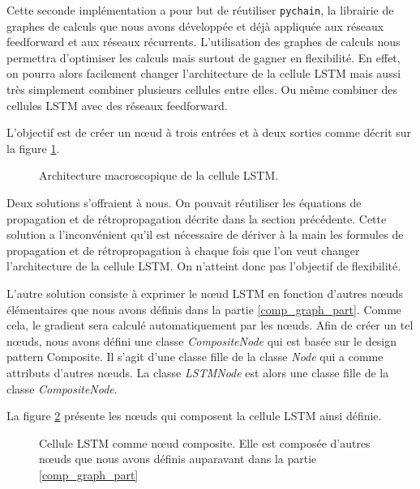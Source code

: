 Cette seconde implémentation a pour but de réutiliser \texttt{pychain}, la librairie de graphes de calculs que nous avons développée et déjà appliquée aux réseaux feedforward et aux réseaux récurrents. L'utilisation des graphes de calculs nous permettra d'optimiser les calculs mais surtout de gagner en flexibilité. En effet, on pourra alors facilement changer l'architecture de la cellule LSTM mais aussi très simplement combiner plusieurs cellules entre elles. Ou même combiner des cellules LSTM avec des réseaux feedforward.

L'objectif est de créer un n\oe{}ud à trois entrées et à deux sorties comme décrit sur la figure \ref{lstm_node_macro}.

\begin{figure}[h!]
\begin{center}

\caption{Architecture macroscopique de la cellule LSTM.}
\label{lstm_node_macro}
\end{center}
\end{figure}

Deux solutions s'offraient à nous. On pouvait réutiliser les équations de propagation et de rétropropagation décrite dans la section précédente. Cette solution a l'inconvénient qu'il est nécessaire de dériver à la main les formules de propagation et de rétropropagation à chaque fois que l'on veut changer l'architecture de la cellule LSTM. On n'atteint donc pas l'objectif de flexibilité.

L'autre solution consiste à exprimer le n\oe{}ud LSTM en fonction d'autres n\oe{}uds élémentaires que nous avons définis dans la partie \ref{comp_graph_part}. Comme cela, le gradient sera calculé automatiquement par les n\oe{}uds. Afin de créer un tel n\oe{}uds, nous avons défini une classe \textit{CompositeNode} qui est basée sur le design pattern Composite. Il s'agit d'une classe fille de la classe \textit{Node} qui a comme attributs d'autres n\oe{}uds. La classe \textit{LSTMNode} est alors une classe fille de la classe \textit{CompositeNode}.

La figure \ref{lstm_node_micro} présente les n\oe{}uds qui composent la cellule LSTM ainsi définie.

\begin{figure}[h!]
\begin{center}

\caption{Cellule LSTM comme n\oe{}ud composite. Elle est composée d'autres n\oe{}uds que nous avons définis auparavant dans la partie \ref{comp_graph_part}}
\label{lstm_node_micro}
\end{center}
\end{figure}

